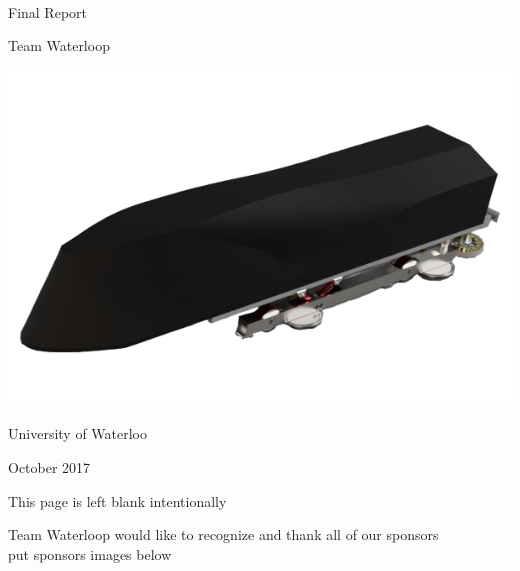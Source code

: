 \documentclass[11pt,a4paper,oldfontcommands]{memoir}
\begin{document}
%
%
\thispagestyle{empty}

{%
\sffamily
\centering
\Large

~\vspace{\fill}

{\huge 
Final Report
}

\vspace{2.5cm}

{\LARGE
Team Waterloop
}

\includegraphics[width=\textwidth]{assembled_goose.png}

\vspace{3.5cm}

University of Waterloo

\vspace{\fill}

October 2017

}%
\clearpage
\begin{center}
This page is left blank intentionally
\end{center}
\clearpage
\begin{center}
Team Waterloop would like to recognize and thank all of our sponsors\\
put sponsors images below
\end{center}
\clearpage

\tableofcontents*
\end{document}
